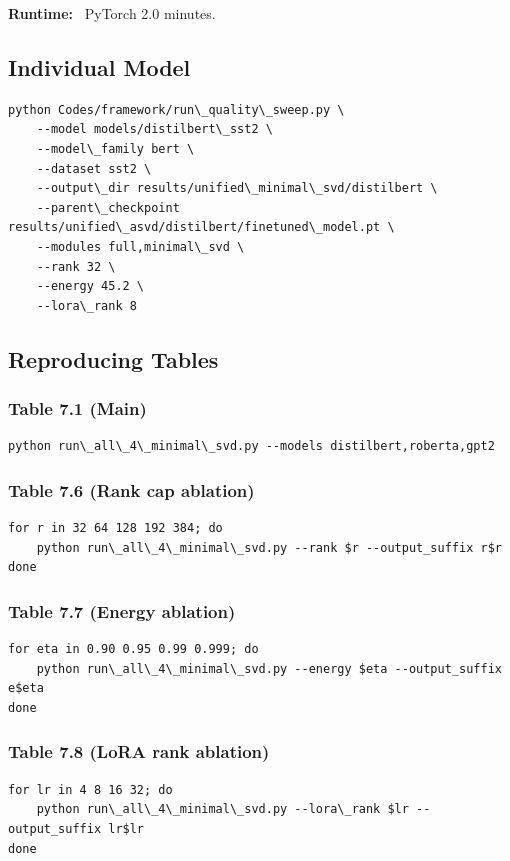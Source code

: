 \textbf{Runtime:} ~PyTorch 2.0 minutes.

\subsection{Individual Model}

\begin{lstlisting}
python Codes/framework/run\_quality\_sweep.py \
    --model models/distilbert\_sst2 \
    --model\_family bert \
    --dataset sst2 \
    --output\_dir results/unified\_minimal\_svd/distilbert \
    --parent\_checkpoint results/unified\_asvd/distilbert/finetuned\_model.pt \
    --modules full,minimal\_svd \
    --rank 32 \
    --energy 45.2 \
    --lora\_rank 8
\end{lstlisting}

\subsection{Reproducing Tables}

\subsubsection{Table 7.1 (Main)}
\begin{lstlisting}
python run\_all\_4\_minimal\_svd.py --models distilbert,roberta,gpt2
\end{lstlisting}

\subsubsection{Table 7.6 (Rank cap ablation)}
\begin{lstlisting}
for r in 32 64 128 192 384; do
    python run\_all\_4\_minimal\_svd.py --rank $r --output_suffix r$r
done
\end{lstlisting}

\subsubsection{Table 7.7 (Energy ablation)}
\begin{lstlisting}
for eta in 0.90 0.95 0.99 0.999; do
    python run\_all\_4\_minimal\_svd.py --energy $eta --output_suffix e$eta
done
\end{lstlisting}

\subsubsection{Table 7.8 (LoRA rank ablation)}
\begin{lstlisting}
for lr in 4 8 16 32; do
    python run\_all\_4\_minimal\_svd.py --lora\_rank $lr --output_suffix lr$lr
done
\end{lstlisting}

